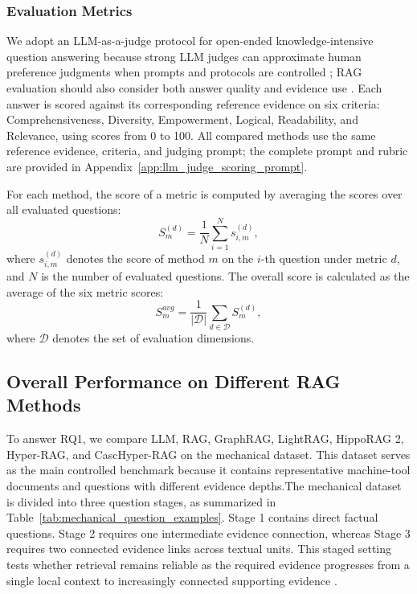 \documentclass[a4paper,fleqn]{cas-dc}
\begin{document}
\subsubsection{Evaluation Metrics}

We adopt an LLM-as-a-judge protocol for open-ended knowledge-intensive question answering because strong LLM judges can approximate human preference judgments when prompts and protocols are controlled \citep{Liu2023GEval}; RAG evaluation should also consider both answer quality and evidence use \citep{Es2024RAGAS}. Each answer is scored against its corresponding reference evidence on six criteria: Comprehensiveness, Diversity, Empowerment, Logical, Readability, and Relevance, using scores from 0 to 100. All compared methods use the same reference evidence, criteria, and judging prompt; the complete prompt and rubric are provided in Appendix~\ref{app:llm_judge_scoring_prompt}.

For each method, the score of a metric is computed by averaging the scores over all evaluated questions:
\begin{equation}
S_m^{(d)} = \frac{1}{N}\sum_{i=1}^{N} s_{i,m}^{(d)},
\end{equation}
where \(s_{i,m}^{(d)}\) denotes the score of method \(m\) on the \(i\)-th question under metric \(d\), and \(N\) is the number of evaluated questions. The overall score is calculated as the average of the six metric scores:
\begin{equation}
S_m^{avg} = \frac{1}{|\mathcal{D}|}\sum_{d \in \mathcal{D}} S_m^{(d)},
\end{equation}
where \(\mathcal{D}\) denotes the set of evaluation dimensions.
\subsection{Overall Performance on Different RAG Methods}

To answer RQ1, we compare LLM, RAG, GraphRAG, LightRAG, HippoRAG 2, Hyper-RAG, and CascHyper-RAG on the mechanical dataset. This dataset serves as the main controlled benchmark because it contains representative machine-tool documents and questions with different evidence depths.The mechanical dataset is divided into three question stages, as summarized in Table~\ref{tab:mechanical_question_examples}. Stage 1 contains direct factual questions. Stage 2 requires one intermediate evidence connection, whereas Stage 3 requires two connected evidence links across textual units. This staged setting tests whether retrieval remains reliable as the required evidence progresses from a single local context to increasingly connected supporting evidence \citep{Yang2018HotpotQA}.
\end{document}
